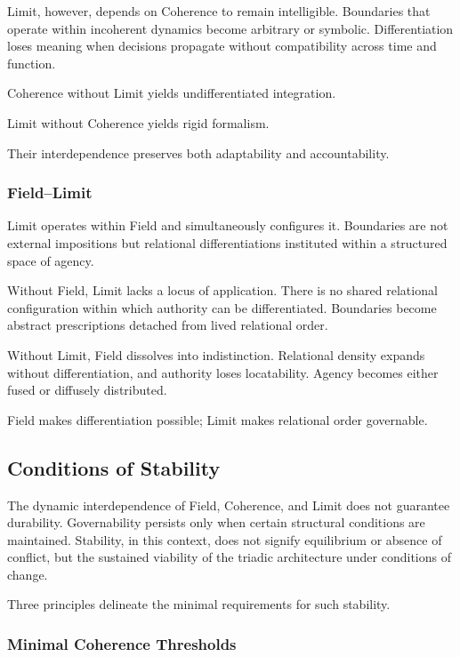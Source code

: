 \documentclass[12pt]{article}
\begin{document}
Limit, however, depends on Coherence to remain intelligible. Boundaries that operate within incoherent dynamics become arbitrary or symbolic. Differentiation loses meaning when decisions propagate without compatibility across time and function.

Coherence without Limit yields undifferentiated integration.

Limit without Coherence yields rigid formalism.

Their interdependence preserves both adaptability and accountability.

\subsubsection{Field–Limit}


Limit operates within Field and simultaneously configures it. Boundaries are not external impositions but relational differentiations instituted within a structured space of agency.

Without Field, Limit lacks a locus of application. There is no shared relational configuration within which authority can be differentiated. Boundaries become abstract prescriptions detached from lived relational order.

Without Limit, Field dissolves into indistinction. Relational density expands without differentiation, and authority loses locatability. Agency becomes either fused or diffusely distributed.

Field makes differentiation possible; Limit makes relational order governable.

\subsection{Conditions of Stability}


The dynamic interdependence of Field, Coherence, and Limit does not guarantee durability. Governability persists only when certain structural conditions are maintained. Stability, in this context, does not signify equilibrium or absence of conflict, but the sustained viability of the triadic architecture under conditions of change.

Three principles delineate the minimal requirements for such stability.

\subsubsection{Minimal Coherence Thresholds}
\end{document}
